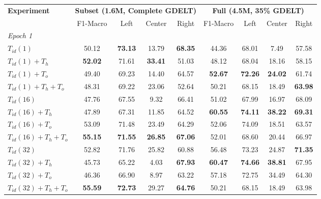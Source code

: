 \begin{table}
\centering
\small
\begin{tabular}{@{}lcccccccc@{}}
\toprule
\textbf{Experiment} & \multicolumn{4}{c}{\textbf{Subset (1.6M, Complete GDELT)}} & \multicolumn{4}{c}{\textbf{Full (4.5M, 35\% GDELT)}} \\
\cmidrule(lr){2-5} \cmidrule(lr){6-9}
 & F1-Macro & Left & Center & Right &  F1-Macro & Left & Center & Right \\
\midrule
\multicolumn{9}{l}{\textit{Epoch 1}} \\
\midrule
$T_{id}(1)$          & 50.12 & \cellcolor{blue!15}\textbf{73.13} & 13.79 & \cellcolor{blue!15}\textbf{68.35} & 44.36 & 68.01 & 7.49 & 57.58 \\
$T_{id}(1) + T_h$    & \cellcolor{blue!15}\textbf{52.02} & 71.61 & \cellcolor{blue!15}\textbf{33.41} & 51.03 & 48.12 & 68.04 & 18.16 & 58.15 \\
$T_{id}(1) + T_o$    & 49.40 & 69.23 & 14.40 & \cellcolor{blue!15}64.57 & \textbf{52.67} & \textbf{72.26} & \textbf{24.02} & 61.74 \\
$T_{id}(1) + T_h + T_o$ & 48.31 & 69.22 & 23.06 & 52.64 & 50.21 & 68.15 & 18.49 & \textbf{63.98} \\
\midrule
$T_{id}(16)$         & 47.76 & 67.55 & 9.32 & \cellcolor{blue!15}66.41 & 51.02 & 67.99 & 16.97 & 68.09 \\
$T_{id}(16) + T_h$   & 47.89 & 67.31 & 11.85 & 64.52 & \cellcolor{blue!15}\textbf{60.55} & \textbf{74.11} & \cellcolor{blue!15}\textbf{38.22} & \cellcolor{blue!15}\textbf{69.31} \\
$T_{id}(16) + T_o$   & 53.09 & 71.48 & \cellcolor{blue!15}23.49 & 64.29 & 52.06 & 74.09 & 18.51 & 63.57 \\
$T_{id}(16) + T_h + T_o$ & \textbf{55.15} & \textbf{71.55} & \textbf{26.85} & \cellcolor{blue!15}\textbf{67.06} & 52.01 & 68.60 & 20.44 & 66.97 \\
\midrule
$T_{id}(32)$         & 52.82 & 71.76 & 25.82 & 60.88 & 56.48 & 73.23 & 24.87 & \cellcolor{blue!15}\textbf{71.35} \\
$T_{id}(32) + T_h$   & 45.73 & 65.22 & \cellcolor{blue!15}4.03 & \textbf{67.93} & \textbf{60.47} & \textbf{74.66} & \textbf{38.81} & 67.95 \\
$T_{id}(32) + T_o$   & 46.36 & 66.90 & 8.97 & 63.22 & \cellcolor{blue!15}57.18 & \cellcolor{blue!15}72.75 & \cellcolor{blue!15}34.49 & 64.30 \\
$T_{id}(32) + T_h + T_o$ & \cellcolor{blue!15}\textbf{55.59} & \cellcolor{blue!15}\textbf{72.73} & \cellcolor{blue!15}29.27 & \cellcolor{blue!15}\textbf{64.76} & 50.21 & 68.15 & 18.49 & \cellcolor{blue!15}63.98 \\

\end{tabular}
\end{table}
